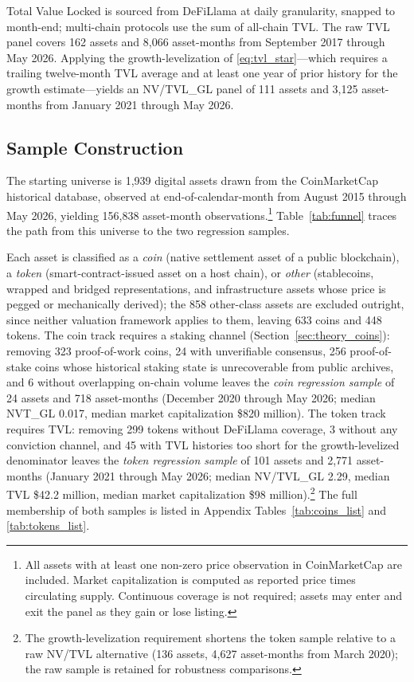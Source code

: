 \documentclass[12pt]{article}
\begin{document}
Total Value Locked is sourced from DeFiLlama at daily granularity, snapped to month-end;
multi-chain protocols use the sum of all-chain TVL. The raw TVL panel covers 162 assets
and 8,066 asset-months from September 2017 through May 2026. Applying the
growth-levelization of \eqref{eq:tvl_star}---which requires a trailing twelve-month TVL
average and at least one year of prior history for the growth estimate---yields an
NV/TVL\_GL panel of 111 assets and 3,125 asset-months from January 2021 through May 2026.

\subsection{Sample Construction}
\label{sec:data_sample}

The starting universe is 1,939 digital assets drawn from the CoinMarketCap historical
database, observed at end-of-calendar-month from August 2015 through May 2026, yielding
156,838 asset-month observations.\footnote{All assets with at least one non-zero price
observation in CoinMarketCap are included. Market capitalization is computed as reported
price times circulating supply. Continuous coverage is not required; assets may enter and
exit the panel as they gain or lose listing.} Table~\ref{tab:funnel} traces the path
from this universe to the two regression samples.

Each asset is classified as a \textit{coin} (native settlement asset of a public
blockchain), a \textit{token} (smart-contract-issued asset on a host chain), or
\textit{other} (stablecoins, wrapped and bridged representations, and infrastructure
assets whose price is pegged or mechanically derived); the 858 other-class assets are
excluded outright, since neither valuation framework applies to them, leaving 633
coins and 448 tokens. The coin track requires a staking channel
(Section~\ref{sec:theory_coins}): removing 323 proof-of-work coins, 24 with
unverifiable consensus, 256 proof-of-stake coins whose historical staking state is
unrecoverable from public archives, and 6 without overlapping on-chain volume leaves
the \textit{coin regression sample} of 24 assets and 718 asset-months (December 2020
through May 2026; median NVT\_GL 0.017, median market capitalization \$820 million).
The token track requires TVL: removing 299 tokens without DeFiLlama coverage, 3
without any conviction channel, and 45 with TVL histories too short for the
growth-levelized denominator leaves the \textit{token regression sample} of 101 assets
and 2,771 asset-months (January 2021 through May 2026; median NV/TVL\_GL 2.29, median
TVL \$42.2 million, median market capitalization \$98 million).\footnote{The
growth-levelization requirement shortens the token sample relative to a raw NV/TVL
alternative (136 assets, 4,627 asset-months from March 2020); the raw sample is
retained for robustness comparisons.} The full membership
of both samples is listed in Appendix Tables~\ref{tab:coins_list} and
\ref{tab:tokens_list}.
\end{document}
